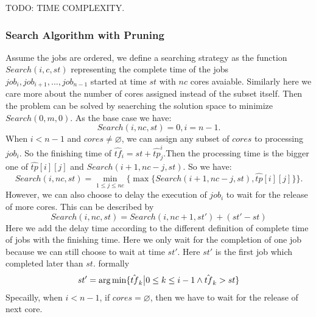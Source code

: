 \documentclass{llncs}
\begin{document}
TODO: TIME COMPLEXITY.
\subsubsection{Search Algorithm with Pruning}
  Assume the jobs are ordered, we define a searching strategy as the function $Search(i,c,st)$ representing the complete time of the jobs $job_i,job_{i+1},...,job_{n-1}$ started at time $st$ with $nc$ cores avaiable. Similarly here we care more about the number of cores assigned instead of the subset itself. Then the problem can be solved by seaerching the solution space to minimize $Search(0,m,0)$. As the base case we have:
  \begin{equation*}
  Search(i,nc,st) = 0 , i = n-1.
  \end{equation*}
  When $i<n-1$ and $cores \neq \varnothing$, we can assign any subset of $cores$ to processing $job_i$. So the finishing time of $\hat{tf}_i = st + \hat{tp}_j^i$.Then the processing time is the bigger one of $\hat{tp}[i][j]$ and $Search(i+1,nc-j,st)$. So we have:
    \begin{equation*}
  Search(i,nc,st) = \min_{1\leq j \leq nc} \{\max \{Search(i+1,nc-j,st),\hat{tp}[i][j]\}\}.
    \end{equation*}
  However, we can also choose to delay the execution of $job_i$ to wait for the release of more cores. This can be described by
  $$
  Search(i,nc,st) = Search (i,nc+1,st') + (st' - st)
  $$
  Here we add the delay time according to the different definition of complete time of jobs with the finishing time. Here we only wait for the completion of one job because we can still choose to wait at time $st'$. Here $st'$ is the first job which completed later than $st$. formally
  $$
  st' = \arg \min \{\hat{tf}_k\big{|} 0\leq k \leq i-1 \land \hat{tf}_k > st\}
  $$
  Specailly, when $i<n-1$, if $cores = \varnothing$, then we have to wait for the release of next core.
\end{document}
